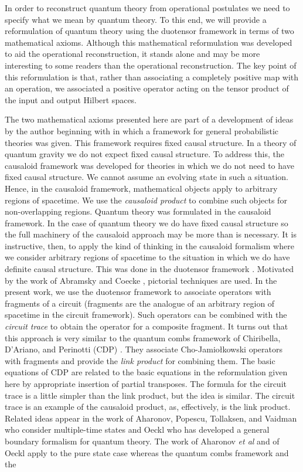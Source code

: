 \documentclass[10pt]{article}
\begin{document}
In order to reconstruct quantum theory from operational postulates we need to specify what we mean by quantum theory.  To this end, we will provide a reformulation of quantum theory using the duotensor framework \cite{hardy2010formalism} in terms of two mathematical axioms.  Although this mathematical reformulation was developed to aid the operational reconstruction, it stands alone and may be more interesting to some readers than the operational reconstruction.  The key point of this reformulation is that, rather than associating a completely positive map with an operation, we associated a positive operator acting on the tensor product of the input and output Hilbert spaces.

The two mathematical axioms presented here are part of a development of ideas by the author beginning with \cite{hardy2001quantum} in which a framework for general probabilistic theories was given.  This framework requires fixed causal structure. In a theory of quantum gravity we do not expect fixed causal structure.  To address this, the causaloid framework \cite{hardy2005probability} was developed for theories in which we do not need to have fixed causal structure.  We cannot assume an evolving state in such a situation.  Hence, in the causaloid framework, mathematical objects apply to arbitrary regions of spacetime.  We use the \emph{causaloid product} to combine such objects for non-overlapping regions.  Quantum theory was formulated in the causaloid framework.  In the case of quantum theory we do have fixed causal structure so the full machinery of the causaloid approach may be more than is necessary.  It is instructive, then, to apply the kind of thinking in the causaloid formalism where we consider arbitrary regions of spacetime to the situation in which we do have definite causal structure.  This was done in the duotensor framework \cite{hardy2010formalism}.  Motivated by the work of Abramsky and Coecke \cite{abramsky2004categorical}, pictorial techniques are used.   In the present work, we use the duotensor framework to associate operators with fragments of a circuit (fragments are the analogue of an arbitrary region of spacetime in the circuit framework).  Such operators can be combined with the \emph{circuit trace} to obtain the operator for a composite fragment.   It turns out that this approach is very similar to the quantum combs framework of Chiribella, D'Ariano, and Perinotti (CDP) \cite{chiribella2009theoretical}.  They associate  Cho-Jamio\l kowski operators with fragments and provide the \emph{link product} for combining them.  The basic equations of  CDP are related to the basic equations in the reformulation given here by appropriate insertion of partial transposes. The formula for the circuit trace is a little simpler than the link product, but the idea is similar. The circuit trace is an example of the causaloid product, as, effectively, is the link product.   Related ideas appear in the work of Aharonov, Popescu, Tollaksen, and Vaidman \cite{aharonov2009multiple} who consider multiple-time states and Oeckl \cite{oeckl2003general} who has developed a general boundary formalism for quantum theory.  The work of Aharonov {\it et al} and of Oeckl apply to the pure state case whereas the quantum combs framework and the 
\end{document}
